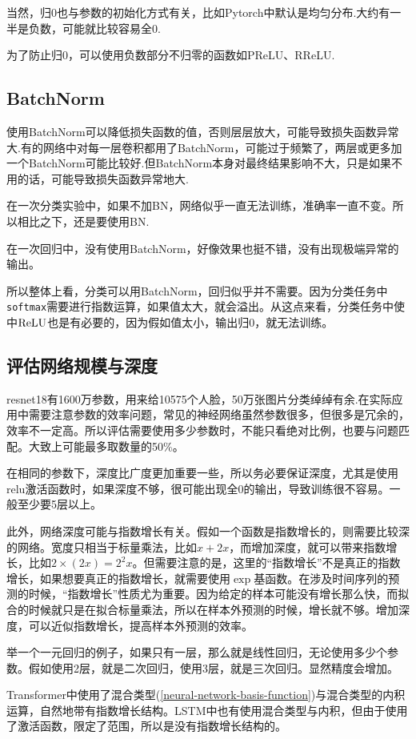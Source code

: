 当然，归0也与参数的初始化方式有关，比如Pytorch中默认是均匀分布.大约有一半是负数，可能就比较容易全0.

为了防止归0，可以使用负数部分不归零的函数如PReLU、RReLU.


\subsection{BatchNorm}
使用BatchNorm可以降低损失函数的值，否则层层放大，可能导致损失函数异常大.有的网络中对每一层卷积都用了BatchNorm，可能过于频繁了，两层或更多加一个BatchNorm可能比较好.但BatchNorm本身对最终结果影响不大，只是如果不用的话，可能导致损失函数异常地大.

在一次分类实验中，如果不加BN，网络似乎一直无法训练，准确率一直不变。所以相比之下，还是要使用BN.

在一次回归中，没有使用BatchNorm，好像效果也挺不错，没有出现极端异常的输出。

所以整体上看，分类可以用BatchNorm，回归似乎并不需要。因为分类任务中\texttt{softmax}需要进行指数运算，如果值太大，就会溢出。从这点来看，分类任务中使中$\operatorname{ReLU}$也是有必要的，因为假如值太小，输出归0，就无法训练。
\subsection{评估网络规模与深度}
resnet18有1600万参数，用来给10575个人脸，50万张图片分类绰绰有余.在实际应用中需要注意参数的效率问题，常见的神经网络虽然参数很多，但很多是冗余的，效率不一定高。所以评估需要使用多少参数时，不能只看绝对比例，也要与问题匹配。大致上可能最多取数量的50\%。

在相同的参数下，深度比广度更加重要一些，所以务必要保证深度，尤其是使用relu激活函数时，如果深度不够，很可能出现全0的输出，导致训练很不容易。一般至少要5层以上。

此外，网络深度可能与指数增长有关。假如一个函数是指数增长的，则需要比较深的网络。宽度只相当于标量乘法，比如$x+2x$，而增加深度，就可以带来指数增长，比如$2\times(2 x)=2^2x$。但需要注意的是，这里的“指数增长”不是真正的指数增长，如果想要真正的指数增长，就需要使用$\exp$基函数。在涉及时间序列的预测的时候，“指数增长”性质尤为重要。因为给定的样本可能没有增长那么快，而拟合的时候就只是在拟合标量乘法，所以在样本外预测的时候，增长就不够。增加深度，可以近似指数增长，提高样本外预测的效率。

举一个一元回归的例子，如果只有一层，那么就是线性回归，无论使用多少个参数。假如使用2层，就是二次回归，使用3层，就是三次回归。显然精度会增加。

Transformer中使用了混合类型(\ref{neural-network-basis-function})与混合类型的内积运算，自然地带有指数增长结构。LSTM中也有使用混合类型与内积，但由于使用了激活函数，限定了范围，所以是没有指数增长结构的。


